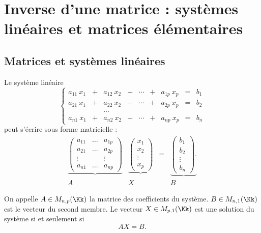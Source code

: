 \documentclass[class=report,crop=false]{standalone}
\begin{document}
\section{Inverse d'une matrice : systèmes linéaires et matrices élémentaires}


\subsection{Matrices et systèmes linéaires}

Le système linéaire
\[ \left\{
\begin{array}{ccccccccc}
a_{11} \  x_1 &+& a_{12}\  x_2 &+& \cdots &+& a_{1p}\  x_p & = & b_1\\
a_{21}\  x_1 &+& a_{22}\  x_2 &+& \cdots &+& a_{2p}\  x_p & = & b_2\\
&&\dots  && &&\\
a_{n1}\  x_1 &+& a_{n2}\  x_2 &+& \cdots &+& a_{np}\  x_p & = & b_n
\end{array} \right.
\]
peut s'écrire sous forme matricielle :
\begin{equation*}\begin{array}{cccc}
\underbrace{
\left(
\begin{array}{ccc}
a_{11} & \dots & a_{1p}\\
a_{21} & \dots & a_{2p}\\
\vdots &&\vdots\\
a_{n1} &\dots & a_{np}
\end{array}
\right)
}
&
\underbrace{
\left(
\begin{array}{c}
x_1\\
x_2\\
\vdots\\
x_p
\end{array}
\right)
}
& = &
\underbrace{
\left(
\begin{array}{c}
b_1\\
b_2\\
\vdots\\
b_n
\end{array}
\right).
}
\\
A & X & &B
\end{array}\end{equation*}

On appelle $A \in M_{n,p}(\Kk)$ la matrice des coefficients du système.
$B\in M_{n,1}(\Kk)$ est le vecteur du second membre.
Le vecteur $X \in M_{p,1}(\Kk)$ est une solution du système si et seulement si
$$AX = B.$$
\end{document}
